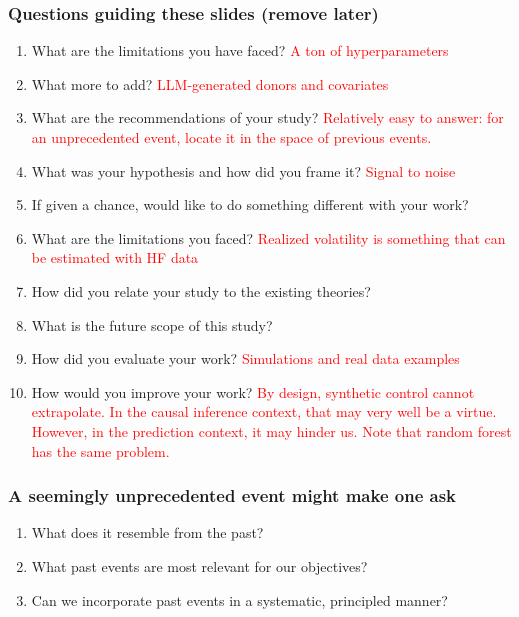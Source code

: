 \documentclass[9pt]{beamer}
\theoremstyle{definition}
\begin{document}
\begin{frame}
    \frametitle{Questions guiding these slides (remove later)}
    \begin{enumerate}
        \item What are the limitations you have faced?
        \textcolor{red}{A ton of hyperparameters}
        \item What more to add? \textcolor{red}{LLM-generated donors and covariates}
        \item What are the recommendations of your study? \textcolor{red}{Relatively easy to answer: for an unprecedented event, locate it in the space of previous events.}
        \item What was your hypothesis and how did you frame it? \textcolor{red}{Signal to noise}
        
        \item If given a chance, would like to do something different with your work?
        \item What are the limitations you faced?
        \textcolor{red}{Realized volatility is something that can be estimated with HF data}
        \item How did you relate your study to the existing theories?
        \item What is the future scope of this study?
         \item How did you evaluate your work?
        \textcolor{red}{Simulations and real data examples}
        \item How would you improve your work?  \textcolor{red}{By design, synthetic control cannot extrapolate.  In the causal inference context, that may very well be a virtue.  However, in the prediction context, it may hinder us.  Note that random forest has the same problem.}
    \end{enumerate}
    \end{frame}

\begin{frame}
\frametitle{A seemingly unprecedented event might make one ask}
\begin{enumerate}
    \item <1-> What does it resemble from the past?
    \item <2-> What past events are most relevant for our objectives?
    \item <3-> Can we incorporate past events in a systematic, principled manner?
\end{enumerate}
\end{frame}
\end{document}
